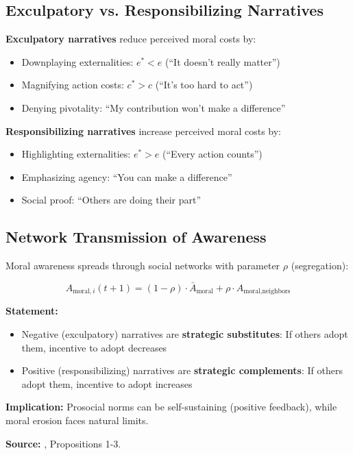 \subsection{Exculpatory vs. Responsibilizing Narratives}

\begin{definition}
\textbf{Exculpatory narratives} reduce perceived moral costs by:
\begin{itemize}[nosep]
\item Downplaying externalities: $e^* < e$ (``It doesn't really matter'')
\item Magnifying action costs: $c^* > c$ (``It's too hard to act'')
\item Denying pivotality: ``My contribution won't make a difference''
\end{itemize}

\textbf{Responsibilizing narratives} increase perceived moral costs by:
\begin{itemize}[nosep]
\item Highlighting externalities: $e^* > e$ (``Every action counts'')
\item Emphasizing agency: ``You can make a difference''
\item Social proof: ``Others are doing their part''
\end{itemize}
\end{definition}

\subsection{Network Transmission of Awareness}
\label{subsec:aware-network}

Moral awareness spreads through social networks with parameter $\rho$ (segregation):

\begin{equation}
A_{\text{moral},i}(t+1) = (1-\rho) \cdot \bar{A}_{\text{moral}} + \rho \cdot A_{\text{moral},\text{neighbors}}
\end{equation}

\begin{tcolorbox}[colback=gray!5!white, colframe=gray!75!black,
    title=Axiom AWX-A5: Narrative Transmission]
\textbf{Statement:}
\begin{itemize}[nosep]
\item Negative (exculpatory) narratives are \textbf{strategic substitutes}: If others adopt them, incentive to adopt decreases
\item Positive (responsibilizing) narratives are \textbf{strategic complements}: If others adopt them, incentive to adopt increases
\end{itemize}

\textbf{Implication:} Prosocial norms can be self-sustaining (positive feedback), while moral erosion faces natural limits.

\textbf{Source:} \citet{benabou_2018_narratives}, Propositions 1-3.
\end{tcolorbox}

